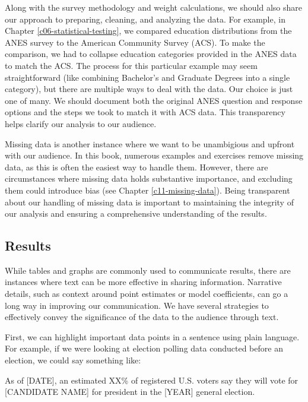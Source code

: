 \documentclass[
]{krantz}
\renewenvironment{quote}{\begin{VF}}{\end{VF}}
\begin{document}
Along with the survey methodology and weight calculations, we should also share our approach to preparing, cleaning, and analyzing the data. For example, in Chapter \ref{c06-statistical-testing}, we compared education distributions from the ANES survey to the American Community Survey (ACS). To make the comparison, we had to collapse education categories provided in the ANES data to match the ACS. The process for this particular example may seem straightforward (like combining Bachelor's and Graduate Degrees into a single category), but there are multiple ways to deal with the data. Our choice is just one of many. We should document both the original ANES question and response options and the steps we took to match it with ACS data. This transparency helps clarify our analysis to our audience.

Missing data is another instance where we want to be unambigious and upfront with our audience. In this book, numerous examples and exercises remove missing data, as this is often the easiest way to handle them. However, there are circumstances where missing data holds substantive importance, and excluding them could introduce bias (see Chapter \ref{c11-missing-data}). Being transparent about our handling of missing data is important to maintaining the integrity of our analysis and ensuring a comprehensive understanding of the results.

\hypertarget{results}{%
\subsection{Results}\label{results}}

While tables and graphs are commonly used to communicate results, there are instances where text can be more effective in sharing information. Narrative details, such as context around point estimates or model coefficients, can go a long way in improving our communication. We have several strategies to effectively convey the significance of the data to the audience through text.

First, we can highlight important data points in a sentence using plain language. For example, if we were looking at election polling data conducted before an election, we could say something like:

\begin{quote}
As of {[}DATE{]}, an estimated XX\% of registered U.S. voters say they will vote for {[}CANDIDATE NAME{]} for president in the {[}YEAR{]} general election.
\end{quote}
\end{document}
